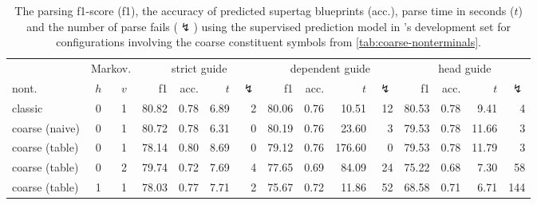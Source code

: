 \documentclass[../../document.tex]{subfiles}
\begin{document}
    \begin{table}
        \caption{\label{tbl:gridsearch:coarse:2}
        The parsing f1-score (f1), the accuracy of predicted supertag blueprints (acc.), parse time in seconds ($t$) and the number of parse fails ($\lightning$) using the supervised prediction model in \negra{}'s development set for configurations involving the coarse constituent symbols from \cref{tab:coarse-nonterminals}.
        }
        \centering
        \vspace{.2cm}
        \setlength{\tabcolsep}{3.4pt}
        \begin{tabular}{lcc|rrrr|rrrr|rrrr}
            \toprule
& \multicolumn{2}{c|}{Markov.}         & \multicolumn{4}{c|}{strict guide} &  \multicolumn{4}{c|}{dependent guide} &  \multicolumn{4}{c}{head guide} \\
nont.           & \(h\) & \(v\) & f1 & acc. & $t$ & $\lightning$ & f1 & acc. & $t$ & $\lightning$  & f1 & acc. & $t$ & $\lightning$  \\ \hline\rowcolor{black!10}
classic        & 0 & 1 & 80.82 & 0.78 & 6.89 & 2 & 80.06 & 0.76 &  10.51 & 12 & 80.53 & 0.78 &  9.41 & 4 \\\rowcolor{black!10}
coarse (naive) & 0 & 1 & 80.72 & 0.78 & 6.31 & 0 & 80.19 & 0.76 &  23.60 &  3 & 79.53 & 0.78 & 11.66 & 3 \\\hline
coarse (table) & 0 & 1 & 78.14 & 0.80 & 8.69 & 0 & 79.12 & 0.76 & 176.60 &  0 & 79.53 & 0.78 & 11.79 & 3 \\
coarse (table) & 0 & 2 & 79.74 & 0.72 & 7.69 & 4 & 77.65 & 0.69 &  84.09 & 24 & 75.22 & 0.68 &  7.30 & 58 \\
coarse (table) & 1 & 1 & 78.03 & 0.77 & 7.71 & 2 & 75.67 & 0.72 &  11.86 & 52 & 68.58 & 0.71 &  6.71 & 144 \\
\bottomrule
        \end{tabular}
    \end{table}
\end{document}

